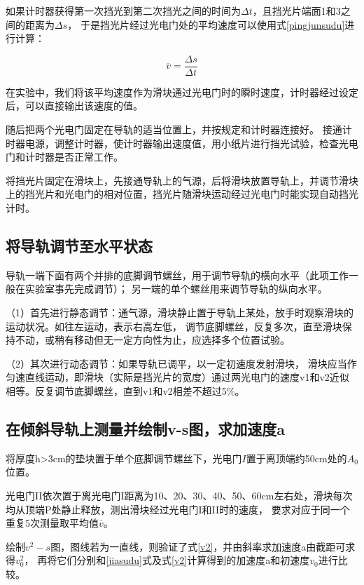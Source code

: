 \documentclass{ctexart}
\begin{document}
  如果计时器获得第一次挡光到第二次挡光之间的时间为$\Delta t$，且挡光片端面1和3之间的距离为$\Delta s$，
  于是挡光片经过光电门处的平均速度可以使用式\ref{pingjunsudu}进行计算：
  
  \begin{equation}\label{pingjunsudu}
    \overline{v} = \frac{\Delta s}{\Delta t}
  \end{equation}

  在实验中，我们将该平均速度作为滑块通过光电门时的瞬时速度，计时器经过设定后，可以直接输出该速度的值。

  随后把两个光电门固定在导轨的适当位置上，并按规定和计时器连接好。
  接通计时器电源，调整计时器，使计时器输出速度值，用小纸片进行挡光试验，检查光电门和计时器是否正常工作。

  将挡光片固定在滑块上，先接通导轨上的气源，后将滑块放置导轨上，并调节滑块上的挡光片和光电门的相对位置，挡光片随滑块运动经过光电门时能实现自动挡光计时。

  \subsection{将导轨调节至水平状态}
  导轨一端下面有两个并排的底脚调节螺丝，用于调节导轨的横向水平（此项工作一般在实验室事先完成调节）；
  另一端的单个螺丝用来调节导轨的纵向水平。

  \noindent（1）首先进行静态调节：通气源，滑块静止置于导轨上某处，放手时观察滑块的运动状况。如往左运动，表示右高左低，
  调节底脚螺丝，反复多次，直至滑块保持不动，或稍有移动但无一定方向性为止，应选择多个位置试验。

  \noindent（2）其次进行动态调节：如果导轨已调平，以一定初速度发射滑块，
  滑块应当作匀速直线运动，即滑块（实际是挡光片的宽度）通过两光电门的速度v1和v2近似相等。反复调节底脚螺丝，直到v1和v2相差不超过5\%。
  
  \subsection{在倾斜导轨上测量并绘制v-s图，求加速度a}
  将厚度h>3cm的垫块置于单个底脚调节螺丝下，光电门$I$置于离顶端约50cm处的$A_{0}$位置。

  光电门II依次置于离光电门I距离为10、20、30、40、50、60cm左右处，滑块每次均从顶端P处静止释放，测出滑块经过光电门I和II时的速度，
  要求对应于同一个重复5次测量取平均值$\overline{v}$。

  绘制$v^{2}-s$图，图线若为一直线，则验证了式\ref{v2}，并由斜率求加速度a由截距可求得$v_{0}^{2}$，
  再将它们分别和\ref{jiasudu}式及式\ref{v2}计算得到的加速度a和初速度$v_{0}$进行比较。
\end{document}
